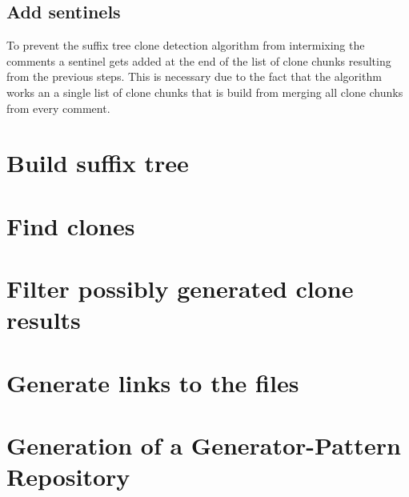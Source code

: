 \subsection{Add sentinels}
To prevent the suffix tree clone detection algorithm from intermixing the comments a sentinel gets added at the end of the list of clone chunks resulting from the previous steps. This is necessary due to the fact that the algorithm works an a single list of clone chunks that is build from merging all clone chunks from every comment.

\section{Build suffix tree}
\section{Find clones}
\section{Filter possibly generated clone results}
\section{Generate links to the files}
\section{Generation of a Generator-Pattern Repository}